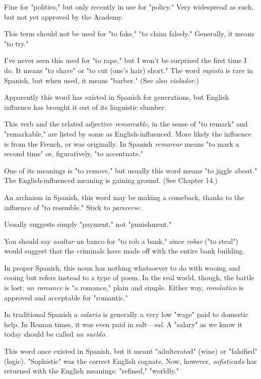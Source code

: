  Fine for "politics," but only recently in use for "policy." Very widespread as such, but not yet approved by the Academy.

 This term should not be used for "to fake," "to
claim falsely." Generally, it means "to try."

 I've never seen this used for "to rape," but I won't be
surprised the first time I do. It means "to shave" or "to cut (one's hair)
short." The word \emph{rapista} is rare in Spanish, but when used, it means
"barber." (See also \emph{violador}.)

 Apparently this word has existed in Spanish
for generations, but English influence has brought it out of its linguistic slumber.

 This verb and the related adjective \emph{remarcable},
in the sense of "to remark" and "remarkable," are listed by some as
English-influenced. More likely the influence is from the French, or
was originally. In Spanish \emph{remarcar} means "to mark a second time"
or, figuratively, "to accentuate."

 One of its meanings is "to remove," but usually
this word means "to jiggle about." The English-influenced meaning is
gaining ground. (See Chapter 14.)

 An archaism in Spanish, this word may be
making a comeback, thanks to the influence of "to resemble." Stick to
\emph{parecerse}.

 Usually suggests simply "payment," not
"punishment."

 You should say \emph{asaltar} un banco for "to
rob a bank," since \emph{robar} ("to steal") would suggest that the criminals
have made off with the entire bank building.

 In proper Spanish, this noun has nothing whatsoever to do with wooing and cooing but refers instead to a type of
poem. In the real world, though, the battle is lost: \emph{un romance} is "a
romance," plain and simple. Either way, \emph{romántico} is approved and acceptable for "romantic."

 In traditional Spanish a \emph{salario} is generally a very
low "wage" paid to domestic help. In Roman times, it was even paid in
salt---\emph{sal}. A "salary" as we know it today should be called \emph{un sueldo}.

 This word once existed in Spanish, but it
meant "adulterated" (wine) or "falsified" (logic). "Sophistic" was
the correct English cognate. Now, however, \emph{sofisticado} has returned
with the English meanings: "refined," "worldly."

